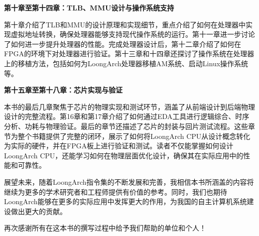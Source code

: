 \textbf{第十章至第十四章：TLB、MMU设计与操作系统支持}

第十章介绍了TLB和MMU的设计原理和实现细节，重点介绍了如何在处理器中实现虚拟地址转换，确保处理器能够支持现代操作系统的运行。第十一章进一步讨论了如何进一步提升处理器的性能。完成处理器设计后，第十二章介绍了如何在FPGA的环境下对处理器进行验证。第十三章和十四章还探讨了操作系统在处理器上的移植方法，包括如何为LoongArch处理器移植AM系统、启动Linux操作系统等。

\textbf{第十五章至第十八章：芯片实现与验证}

本书的最后几章聚焦于芯片的物理实现和测试环节，涵盖了从前端设计到后端物理设计的完整流程。第16章和第17章介绍了如何通过EDA工具进行逻辑综合、时序分析、功耗与物理验证。最后的章节还描述了芯片的封装与回片测试流程。这些章节为整个书籍提供了完整的闭环，展示了如何将LoongArch CPU从设计概念转化为实际的硬件，并在FPGA板上进行验证和测试。读者不仅能掌握如何设计LoongArch CPU，还能学习如何在物理层面优化设计，确保其在实际应用中的性能和可靠性。

展望未来，随着LoongArch指令集的不断发展和完善，我相信本书所涵盖的内容将继续为更多的学术研究者和工程师提供有价值的参考。同时，我们也期待LoongArch能够在更多的实际应用中发挥更大的作用，为我国的自主计算机系统建设做出更大的贡献。

再次感谢所有在这本书的撰写过程中给予我们帮助的单位和个人！
